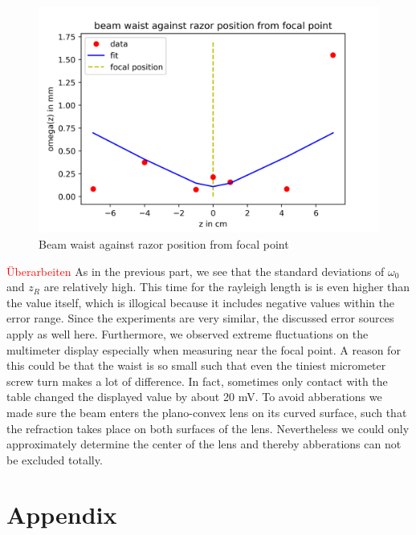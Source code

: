 \documentclass{article}
\begin{document}
\begin{figure}[h!]
\includegraphics[width=\textwidth]{beam waist against razor position from focal point.png}
\caption{Beam waist against razor position from focal point}
\label{beam_waist}
\end{figure}

\textcolor{red}{Überarbeiten}
As in the previous part, we see that the standard deviations of $\omega_{0}$ and $z_{R}$ are relatively high. This time for the rayleigh length is is even higher than the value itself, which is illogical because it includes negative values within the error range. Since the experiments are very similar, the discussed error sources apply as well here. Furthermore, we observed extreme fluctuations on the multimeter display especially when measuring near the focal point. A reason for this could be that the waist is so small such that even the tiniest micrometer screw turn makes a lot of difference. In fact, sometimes only contact with the table changed the displayed value by about 20 mV. To avoid abberations we made sure the beam enters the plano-convex lens on its curved surface, such that the refraction takes place on both surfaces of the lens. Nevertheless we could only approximately determine the center of the lens and thereby abberations can not be excluded totally.

\section{Appendix}
\end{document}
